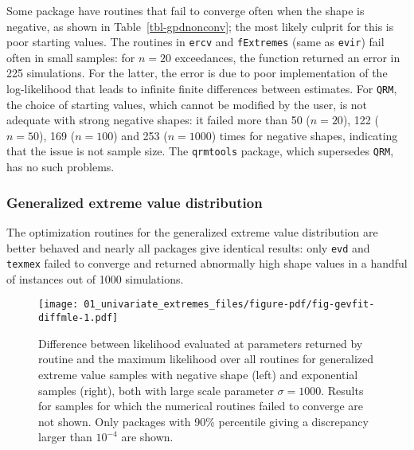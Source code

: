 \documentclass[
  letterpaper,
  DIV=11,
  numbers=noendperiod]{scrartcl}
\begin{document}
Some package have routines that fail to converge often when the shape is
negative, as shown in Table~\ref{tbl-gpdnonconv}; the most likely
culprit for this is poor starting values. The routines in \texttt{ercv}
and \texttt{fExtremes} (same as \texttt{evir}) fail often in small
samples: for \(n=20\) exceedances, the function returned an error in 225
simulations. For the latter, the error is due to poor implementation of
the log-likelihood that leads to infinite finite differences between
estimates. For \texttt{QRM}, the choice of starting values, which cannot
be modified by the user, is not adequate with strong negative shapes: it
failed more than 50 (\(n=20\)), 122 (\(n=50\)), 169 (\(n=100\)) and 253
(\(n=1000\)) times for negative shapes, indicating that the issue is not
sample size. The \texttt{qrmtools} package, which supersedes
\texttt{QRM}, has no such problems.

\hypertarget{generalized-extreme-value-distribution}{%
\subsubsection{Generalized extreme value
distribution}\label{generalized-extreme-value-distribution}}

The optimization routines for the generalized extreme value distribution
are better behaved and nearly all packages give identical results: only
\texttt{evd} and \texttt{texmex} failed to converge and returned
abnormally high shape values in a handful of instances out of 1000
simulations.

\begin{figure}

{\centering \texttt{[image: 01\_univariate\_extremes\_files/figure-pdf/fig-gevfit-diffmle-1.pdf]}

}

\caption{\label{fig-gevfit-diffmle}Difference between likelihood
evaluated at parameters returned by routine and the maximum likelihood
over all routines for generalized extreme value samples with negative
shape (left) and exponential samples (right), both with large scale
parameter \(\sigma=1000\). Results for samples for which the numerical
routines failed to converge are not shown. Only packages with 90\%
percentile giving a discrepancy larger than \(10^{-4}\) are shown.}

\end{figure}
\end{document}
